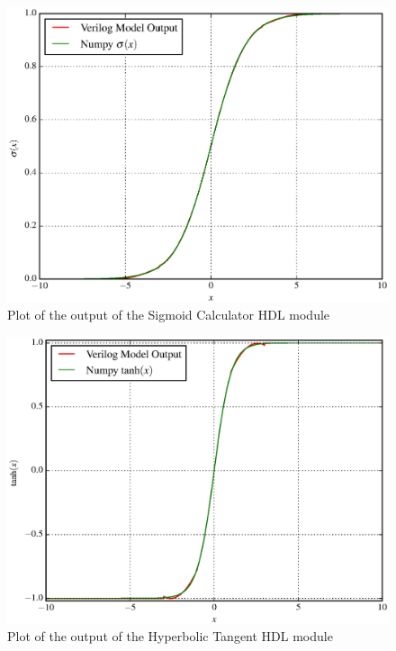 \documentclass{IEEEtran}
\begin{document}
\begin{figure}[!t]
    \centering
    \includegraphics[width=\linewidth]{figures/nonlin-out.eps}
    \caption[Plot of the output of the Sigmoid Calculator HDL module]{Plot of the output of the Sigmoid Calculator HDL module}
    \label{fig:nonlin-out-sig}
\end{figure}

\begin{figure}[!t]
    \centering
    \includegraphics[width=\linewidth]{figures/nonlin-out-tanh.eps}
    \caption[Plot of the output of the Hyperbolic Tangent HDL module]{Plot of the output of the Hyperbolic Tangent HDL module}
    \label{fig:nonlin-out-tanh}
\end{figure}
\end{document}
